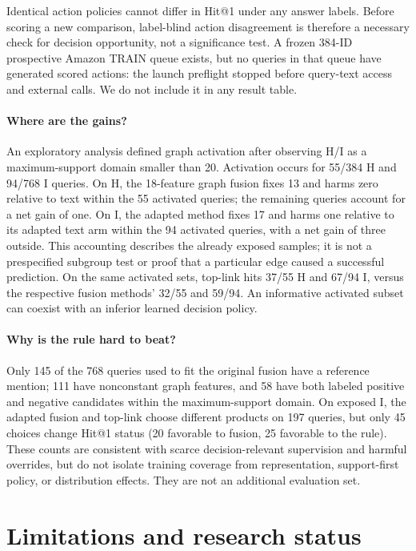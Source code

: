 \documentclass{article}
\begin{document}
Identical action policies cannot differ in Hit@1 under any answer labels.
Before scoring a new comparison, label-blind action disagreement is therefore
a necessary check for decision opportunity, not a significance test. A frozen
384-ID prospective Amazon TRAIN queue exists, but no queries in that queue
have generated scored actions: the launch preflight stopped before query-text
access and external calls. We do not include it in any result table.

\paragraph{Where are the gains?}
An exploratory analysis defined graph activation after observing H/I as a
maximum-support domain smaller than 20. Activation occurs for 55/384 H and
94/768 I queries. On H, the 18-feature graph fusion fixes 13 and harms zero
relative to text within the 55 activated queries; the remaining queries
account for a net gain of one. On I, the adapted method fixes 17 and harms
one relative to its adapted text arm within the 94 activated queries, with
a net gain of three outside. This accounting describes the already exposed
samples; it is not a prespecified subgroup test or proof that a particular
edge caused a successful prediction. On the same activated sets, top-link
hits 37/55 H and 67/94 I, versus the respective fusion methods' 32/55 and
59/94. An informative activated subset can coexist with an inferior learned
decision policy.

\paragraph{Why is the rule hard to beat?}
Only 145 of the 768 queries used to fit the original fusion have a reference
mention; 111 have nonconstant graph features, and 58 have both labeled
positive and negative candidates within the maximum-support domain. On
exposed I, the adapted fusion and top-link choose different products on
197 queries, but only 45 choices change Hit@1 status (20 favorable to fusion,
25 favorable to the rule). These counts are consistent with scarce
decision-relevant supervision and harmful overrides, but do not isolate
training coverage from representation, support-first policy, or distribution
effects. They are not an additional evaluation set.

\section{Limitations and research status}
\end{document}
